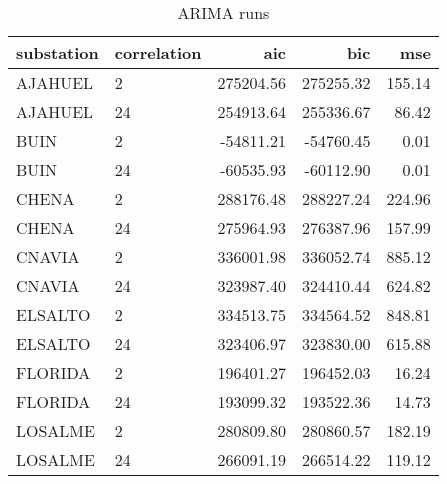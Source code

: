 \begin{table}
\caption{ARIMA runs}
\begin{tabular}{llrrr}
\toprule
substation & correlation & aic & bic & mse \\
\midrule
AJAHUEL & 2 & 275204.56 & 275255.32 & 155.14 \\
AJAHUEL & 24 & 254913.64 & 255336.67 & 86.42 \\
BUIN & 2 & -54811.21 & -54760.45 & 0.01 \\
BUIN & 24 & -60535.93 & -60112.90 & 0.01 \\
CHENA & 2 & 288176.48 & 288227.24 & 224.96 \\
CHENA & 24 & 275964.93 & 276387.96 & 157.99 \\
CNAVIA & 2 & 336001.98 & 336052.74 & 885.12 \\
CNAVIA & 24 & 323987.40 & 324410.44 & 624.82 \\
ELSALTO & 2 & 334513.75 & 334564.52 & 848.81 \\
ELSALTO & 24 & 323406.97 & 323830.00 & 615.88 \\
FLORIDA & 2 & 196401.27 & 196452.03 & 16.24 \\
FLORIDA & 24 & 193099.32 & 193522.36 & 14.73 \\
LOSALME & 2 & 280809.80 & 280860.57 & 182.19 \\
LOSALME & 24 & 266091.19 & 266514.22 & 119.12 \\
\bottomrule
\end{tabular}
\end{table}
